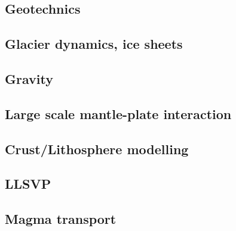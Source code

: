 \subsection*{Geotechnics}

\cite{zhll03}

\subsection*{Glacier dynamics, ice sheets}

\cite{asbl06}
\cite{zhjg11}
\cite{lejx14}
\cite{issg15}

\subsection*{Gravity}

\cite{zhou08}

\subsection*{Large scale mantle-plate interaction}

\cite{algs12}

\subsection*{Crust/Lithosphere modelling}

\cite{daco88}
\cite{nefo93}
\cite{lecd98}
\cite{hanl00}\cite{labp00}
\cite{homo01}
\cite{labu02}
\cite{hagu05}
\cite{libi06}
\cite{afrf07}
\cite{affr08}
\cite{hapo08}
\cite{hamo10}
\cite{kava14}
\cite{dusp14}
\cite{koen19}

\subsection*{LLSVP}

\cite{limc13}

\subsection*{Magma transport}

